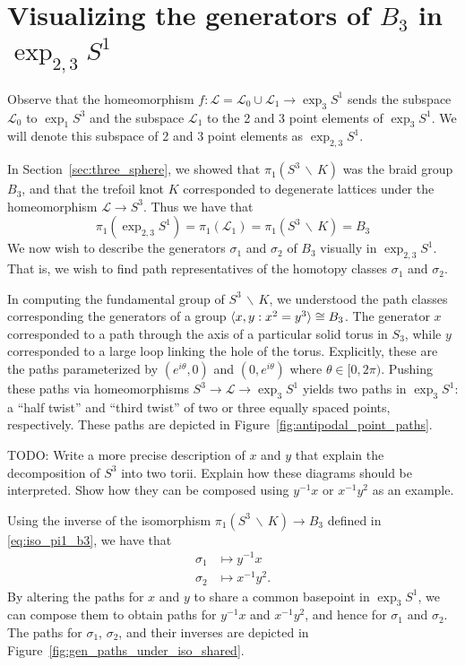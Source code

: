 \documentclass[12pt,twoside]{reedthesis}
\theoremstyle{definition}
\newcommand{\LS}{\mathcal{L}}
\newcommand{\wo}{\, \backslash \,}
\newcommand{\TODO}[1]{{\color{todopink}\textsf{TODO: #1}}}
\DeclarePairedDelimiter\ang{\langle}{\rangle}
\begin{document}
\section{Visualizing the generators of $B_3$ in $\exp_{2,3} S^1$}

Observe that the homeomorphism $f : \LS = \LS_0 \cup \LS_1 \to \exp_3 S^1$ sends the subspace $\LS_0 $ to $\exp_1 S^3$ and the subspace $\LS_1$ to the 2 and 3 point elements of $\exp_3 S^1$.
We will denote this subspace of 2 and 3 point elements as $\exp_{2,3} S^1$.

In Section~\ref{sec:three_sphere}, we showed that $\pi_1(S^3 \wo K)$ was the braid group $B_3$, and that the trefoil knot $K$ corresponded to degenerate lattices under the homeomorphism $\LS \to S^3$.
Thus we have that
\begin{equation*}
  \pi_1(\exp_{2,3} S^1) = \pi_1(\LS_1) = \pi_1(S^3 \wo K) = B_3
\end{equation*}
We now wish to describe the generators $\sigma_1$ and $\sigma_2$ of $B_3$ visually in $\exp_{2,3} S^1$.
That is, we wish to find path representatives of the homotopy classes $\sigma_1$ and $\sigma_2$.

In computing the fundamental group of $S^3 \wo K$, we understood the path classes corresponding the generators of a group $\ang{x, y : x^2 = y^3} \cong B_3$.
The generator $x$ corresponded to a path through the axis of a particular solid torus in $S_3$, while $y$ corresponded to a large loop linking the hole of the torus.
Explicitly, these are the paths parameterized by $(e^{i \theta}, 0)$ and $(0, e^{i \theta})$ where $\theta \in [0, 2 \pi)$.
Pushing these paths via homeomorphisms $S^3 \to \LS \to \exp_3 S^1$ yields two paths in $\exp_3 S^1$: a ``half twist'' and ``third twist'' of two or three equally spaced points, respectively.
These paths are depicted in Figure~\ref{fig:antipodal_point_paths}.

\TODO{Write a more precise description of $x$ and $y$ that explain the decomposition of $S^3$ into two torii. Explain how these diagrams should be interpreted. Show how they can be composed using $y^{-1} x$ or $x^{-1} y^2$ as an example.}

Using the inverse of the isomorphism $\pi_1(S^3 \wo K) \to B_3$ defined in \eqref{eq:iso_pi1_b3}, we have that
\begin{align*}
  \sigma_1 &\mapsto y^{-1} x \\
  \sigma_2 &\mapsto x^{-1} y^2.
\end{align*}
By altering the paths for $x$ and $y$ to share a common basepoint in $\exp_3 S^1$, we can compose them to obtain paths for $y^{-1} x$ and $x^{-1} y^2$, and hence for $\sigma_1$ and $\sigma_2$.
The paths for $\sigma_1$, $\sigma_2$, and their inverses are depicted in Figure~\ref{fig:gen_paths_under_iso_shared}.
\end{document}
